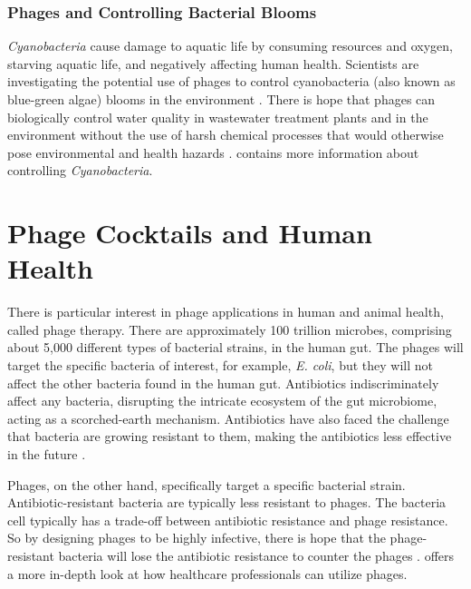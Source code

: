 \subsubsection{Phages and Controlling Bacterial Blooms}
\textit{Cyanobacteria} cause damage to aquatic life by consuming resources and oxygen, starving aquatic life, and negatively affecting human health. 
Scientists are investigating the potential use of phages to control cyanobacteria (also known as blue-green algae) blooms in the environment \cite{colomaFrequencyVirusresistantHosts2019}. 
There is hope that phages can biologically control water quality in wastewater treatment plants and in the environment without the use of harsh chemical processes that would otherwise pose environmental and health hazards \cite{krysiak-baltynSimulationPhageDynamics2017, tuckerIdentificationCyanophageMaLBP2005}. 
 contains more information about controlling \textit{Cyanobacteria}. 

\section{Phage Cocktails and Human Health}
There is particular interest in phage applications in human and animal health, called phage therapy. 
There are approximately 100 trillion microbes, comprising about 5,000 different types of bacterial strains, in the human gut. 
The phages will target the specific bacteria of interest, for example, \textit{E. coli}, but they will not affect the other bacteria found in the human gut. 
Antibiotics indiscriminately affect any bacteria, disrupting the intricate ecosystem of the gut microbiome, acting as a scorched-earth mechanism. 
Antibiotics have also faced the challenge that bacteria are growing resistant to them, making the antibiotics less effective in the future \cite{odonkorBacteriaResistanceAntibiotics2011, volkovaEffectsEarlylifePenicillin2021}. 

Phages, on the other hand, specifically target a specific bacterial strain. 
Antibiotic-resistant bacteria are typically less resistant to phages. 
The bacteria cell typically has a trade-off between antibiotic resistance and phage resistance. 
So by designing phages to be highly infective, there is hope that the phage-resistant bacteria will lose the antibiotic resistance to counter the phages \cite{laurePhageResistancemediatedTradeoffs2022, zhaoPhagedrivenCoevolutionReveals2024}. 
 offers a more in-depth look at how healthcare professionals can utilize phages.

